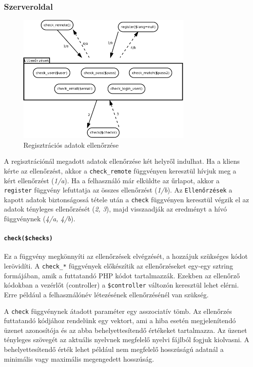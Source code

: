 \documentclass[12pt,a4paper,twoside]{article}
\begin{document}
\subsubsection{Szerveroldal}

\begin{figure}[htp]
  \centering
  \includegraphics[width=328px]{reg_check.png}
  \caption{Regisztrációs adatok ellenőrzése}\label{fig:reg_check}
\end{figure}

A regisztrációnál megadott adatok ellenőrzése két helyről indulhat. Ha a kliens
kérte az ellenőrzést, akkor a \texttt{check\_remote} függvényen keresztül hívjuk
meg a kért ellenőrzést (\emph{1/a}). Ha a felhasználó már elküldte az űrlapot,
akkor a \texttt{register} függvény lefuttatja az összes ellenőrzést
(\emph{1/b}). Az \texttt{Ellenőrzések} a kapott adatok biztonságossá tétele után a
\texttt{check} függvényen keresztül végzik el az adatok tényleges ellenőrzését
(\emph{2, 3}), majd visszaadják az eredményt a hívó függvénynek (\emph{4/a, 4/b}).


\paragraph{\texttt{check(\$checks)}}
Ez a függvény megkönnyíti az ellenőrzések elvégzését, a hozzájuk szükséges kódot
lerövidíti. A \texttt{check\_*} függvények előkészítik az ellenőrzéseket
egy-egy sztring formájában, amik a futtatandó PHP kódot tartalmazzák.
Ezekben az ellenőrző kódokban a vezérlőt (controller) a
\texttt{\$controller} változón keresztül lehet elérni. Erre például a
felhasználónév létezésének ellenőrzésénél van szükség.

A \texttt{check} függvénynek átadott paraméter egy asszociatív tömb. Az
ellenőrzés futtatandó kódjához rendelünk egy vektort, ami a hiba esetén
megjelenítendó üzenet azonosítója és az abba behelyettesítendő értékeket
tartalmazza. Az üzenet tényleges szövegét az aktuális nyelvnek megfelelő nyelvi
fájlból fogjuk kiolvasni. A behelyettesítendő érték lehet például nem megfelelő
hosszúságú adatnál a minimális vagy maximális megengedett hosszúság.
\end{document}
